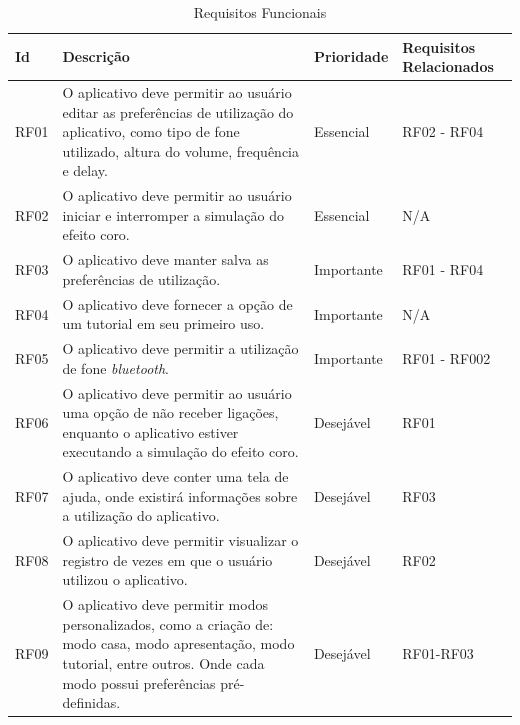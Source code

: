 \begin{table}[H]
	\caption{Requisitos Funcionais}\label{tab:reqfuncionais}
	\centering
	\begin{tabular}{|p{1.0cm}|p{8.0cm}|p{2.0cm}|p{2.5cm}|}
		\hline
		\textbf{Id} & \textbf{Descri\c{c}\~ao} & \textbf{Prioridade} & \textbf{Requisitos Relacionados}\\
		\hline
		RF01 & O aplicativo deve permitir ao usu\'ario editar as prefer\^encias de utiliza\c{c}\~ao do aplicativo, como tipo de fone utilizado, altura do volume, frequ\^encia e delay. & Essencial & RF02 - RF04\\
		\hline
		RF02 & O aplicativo deve permitir ao usu\'ario iniciar e interromper a simula\c{c}\~ao do efeito coro. & Essencial & N/A \\
		\hline
		RF03 & O aplicativo deve manter salva as prefer\^encias de utiliza\c{c}\~ao. & Importante & RF01 - RF04\\
		\hline
		RF04 & O aplicativo deve fornecer a op\c{c}\~ao de um tutorial em seu primeiro uso. & Importante & N/A\\
		\hline
		RF05 & O aplicativo deve permitir a utiliza\c{c}\~ao de fone \textit{bluetooth}. & Importante & RF01 - RF002\\
		\hline
		RF06 & O aplicativo deve permitir ao usu\'ario uma op\c{c}\~ao de n\~ao receber liga\c{c}\~oes, enquanto o aplicativo estiver executando a simula\c{c}\~ao do efeito coro. & Desej\'avel & RF01\\
		\hline
		RF07 & O aplicativo deve conter uma tela de ajuda, onde existir\'a informa\c{c}\~oes sobre a utiliza\c{c}\~ao do aplicativo. & Desej\'avel & RF03\\
		\hline
		RF08 & O aplicativo deve permitir visualizar o registro de vezes em que o usu\'ario utilizou o aplicativo. & Desej\'avel & RF02\\
		\hline
		RF09 & O aplicativo deve permitir modos personalizados, como a cria\c{c}\~ao de: modo casa, modo apresenta\c{c}\~ao, modo tutorial, entre outros. Onde cada modo possui prefer\^encias pr\'e-definidas. & Desej\'avel & RF01-RF03\\
		\hline	
	\end{tabular}
\end{table}


